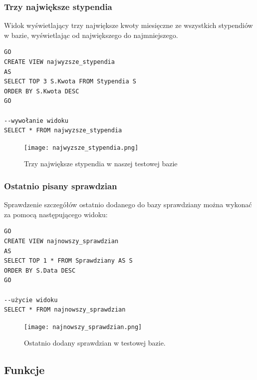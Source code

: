 \documentclass[60pt]{article}
\begin{document}
\subsubsection{Trzy największe stypendia}

Widok wyświetlający trzy największe kwoty miesięczne ze wszystkich stypendiów w bazie, wyświetlając od największego do najmniejszego. 

\begin{verbatim}
GO
CREATE VIEW najwyzsze_stypendia
AS
SELECT TOP 3 S.Kwota FROM Stypendia S
ORDER BY S.Kwota DESC
GO

--wywołanie widoku
SELECT * FROM najwyzsze_stypendia
\end{verbatim}

\begin{figure}[h]
    \begin{center}
      \texttt{[image: najwyzsze\_stypendia.png]}
      \caption{Trzy największe stypendia w naszej testowej bazie}
      \label{Trzy największe stypendia w naszej testowej bazie}
    \end{center}
\end{figure}

\subsubsection{Ostatnio pisany sprawdzian}

Sprawdzenie szczegółów ostatnio dodanego do bazy sprawdziany można wykonać za pomocą następującego widoku:

\begin{verbatim}
GO
CREATE VIEW najnowszy_sprawdzian
AS
SELECT TOP 1 * FROM Sprawdziany AS S
ORDER BY S.Data DESC
GO

--użycie widoku
SELECT * FROM najnowszy_sprawdzian
\end{verbatim}

\begin{figure}[h]
    \begin{center}
      \texttt{[image: najnowszy\_sprawdzian.png]}
      \caption{Ostatnio dodany sprawdzian w testowej bazie.}
      \label{Ostatnio dodany sprawdzian w testowej bazie.}
    \end{center}
\end{figure}

\newpage
\subsection{Funkcje}
\end{document}
